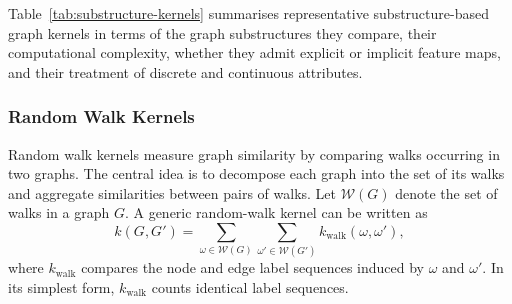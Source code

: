 Table~\ref{tab:substructure-kernels} summarises representative
substructure-based graph kernels in terms of the graph substructures they compare,
their computational complexity, whether they admit explicit or implicit feature
maps, and their treatment of discrete and continuous attributes.
\begin{table}[h]
\centering
\caption{Overview of representative substructure-based graph kernels.}
\label{tab:substructure-kernels}
\end{table}

\subsubsection{Random Walk Kernels}
\label{sec:theory:rw_kernels}

Random walk kernels measure graph similarity by comparing
walks occurring in two graphs.
The central idea is to decompose each graph into the set of
its walks and aggregate similarities between pairs of walks.
Let $\mathcal{W}(G)$ denote the set of walks in a graph $G$.
A generic random-walk kernel can be written as
\[
k(G,G')
=
\sum_{\omega \in \mathcal{W}(G)}
\sum_{\omega' \in \mathcal{W}(G')}
k_{\mathrm{walk}}(\omega,\omega'),
\]
where $k_{\mathrm{walk}}$ compares the node and edge
label sequences induced by $\omega$ and $\omega'$.
In its simplest form, $k_{\mathrm{walk}}$ counts identical
label sequences.

